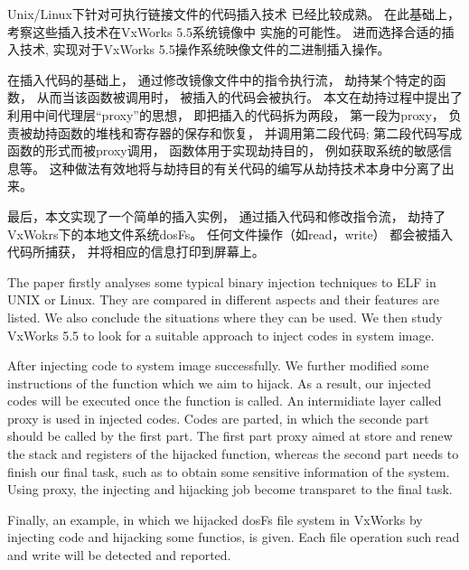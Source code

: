 \begin{cabstract}
Unix/Linux下针对可执行链接文件的代码插入技术
已经比较成熟。
在此基础上，
考察这些插入技术在VxWorks 5.5系统镜像中
实施的可能性。
进而选择合适的插入技术,
实现对于VxWorks 5.5操作系统映像文件的二进制插入操作。


在插入代码的基础上，
通过修改镜像文件中的指令执行流，
劫持某个特定的函数，
从而当该函数被调用时，
被插入的代码会被执行。
本文在劫持过程中提出了利用中间代理层“proxy”的思想，
即把插入的代码拆为两段，
第一段为proxy，
负责被劫持函数的堆栈和寄存器的保存和恢复，
并调用第二段代码;
第二段代码写成函数的形式而被proxy调用，
函数体用于实现劫持目的，
例如获取系统的敏感信息等。
这种做法有效地将与劫持目的有关代码的编写从劫持技术本身中分离了出来。

最后，本文实现了一个简单的插入实例，
通过插入代码和修改指令流，
劫持了VxWokrs下的本地文件系统dosFs。
任何文件操作（如read，write）
都会被插入代码所捕获，
并将相应的信息打印到屏幕上。

\end{cabstract}
\begin{eabstract}
The paper firstly analyses some typical 
binary injection techniques to ELF in UNIX or Linux.
They are compared in different aspects and their features are listed.
We also conclude the situations where they can be used. 
We then study VxWorks 5.5 to look for a suitable approach to 
inject codes in system image.

After injecting code to system image successfully. 
We further modified some 
instructions of the function which we aim to hijack.
As a result, 
our injected codes will be executed once the function is called. 
An intermidiate layer called proxy is used in injected codes.
Codes are parted, in which the seconde part should be called by 
the first part.
The first part proxy aimed at store and renew the stack and 
registers of the hijacked function, 
whereas the second part needs to finish our final task,
such as to obtain some sensitive information of the system.
Using proxy, the injecting and hijacking job become transparet 
to the final task. 

Finally, an example, in which we hijacked dosFs file system 
in VxWorks by injecting code and hijacking some functios, is given.
Each file operation such read and write will be 
detected and reported.   





\end{eabstract}
